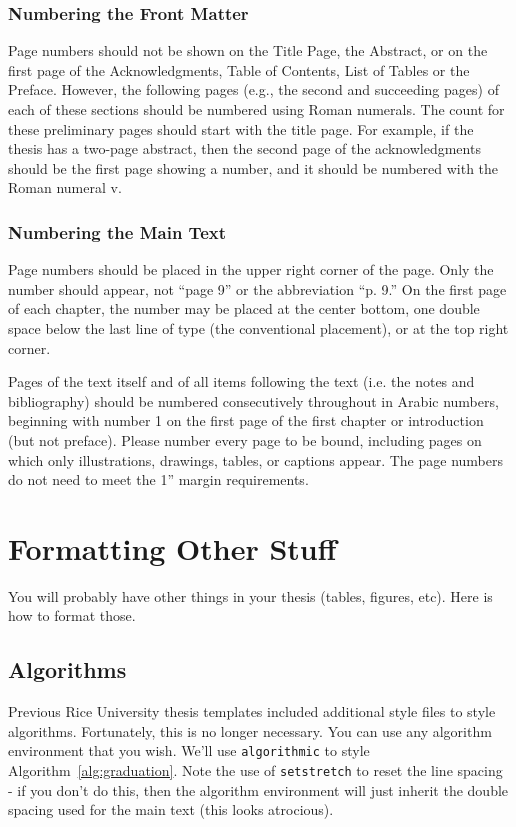 \documentclass[12pt]{ruthesis}
\begin{document}
\subsection{Numbering the Front Matter}

Page numbers should not be shown on the Title Page, the Abstract, or on the first page of the Acknowledgments, Table of Contents, List of Tables or the Preface. However, the following pages (e.g., the second and succeeding pages) of each of these sections should be numbered using Roman numerals. The count for these preliminary pages should start with the title page. For example, if the thesis has a two-page abstract, then the second page of the acknowledgments should be the first page showing a number, and it should be numbered with the Roman numeral v.

\subsection{Numbering the Main Text}

Page numbers should be placed in the upper right corner of the page. Only the number should appear, not ``page 9'' or the abbreviation ``p. 9.'' On the first page of each chapter, the number may be placed at the center bottom, one double space below the last line of type (the conventional placement), or at the top right corner.

Pages of the text itself and of all items following the text (i.e. the notes and bibliography) should be numbered consecutively throughout in Arabic numbers, beginning with number 1 on the first page of the first chapter or introduction (but not preface). Please number every page to be bound, including pages on which only illustrations, drawings, tables, or captions appear. The page numbers do not need to meet the 1'' margin requirements.


\chapter{Formatting Other Stuff}

You will probably have other things in your thesis (tables, figures, etc). Here is how to format those.

\section{Algorithms}

Previous Rice University thesis templates included additional style files to style algorithms. Fortunately, this is no longer necessary. You can use any algorithm environment that you wish. We'll use \verb_algorithmic_ to style Algorithm~\ref{alg:graduation}. Note the use of \verb_setstretch_ to reset the line spacing - if you don't do this, then the algorithm environment will just inherit the double spacing used for the main text (this looks atrocious).
\end{document}
